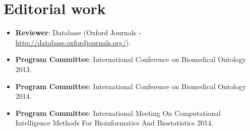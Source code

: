 \section{Editorial work}
\begin{itemize}
  \item \textbf{Reviewer}: Database (Oxford Journals - \url{http://database.oxfordjournals.org/}).
  \item \textbf{Program Committee}: International Conference on Biomedical Ontology 2013.
  \item \textbf{Program Committee}: International Conference on Biomedical Ontology 2014.
  \item \textbf{Program Committee}: International Meeting On Computational Intelligence Methods For Bioinformatics And Biostatistics 2014.
\end{itemize}
